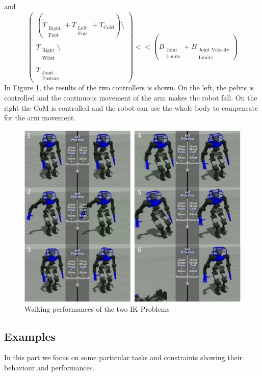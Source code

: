 and
\begin{equation}
\begin{pmatrix}
\left(T_{\substack{\text{Right}\\\text{Foot}}} + T_{\substack{\text{Left}\\\text{Foot}}} + T_\text{CoM}\right)\setminus\\
\\
T_{\substack{\text{Right}\\\text{Wrist}}}\setminus\\
\\
T_{\substack{\text{Joint}\\\text{Posture}}}
\end{pmatrix}
<< \left(B_{\substack{\text{Joint}\\\text{Limits}}} + B_{\substack{\text{Joint Velocity}\\\text{Limits}}}\right)
\end{equation}
In Figure \ref{walk_snapshot}, the results of the two controllers is shown. On the left, the pelvis is controlled and the continuous movement of the arm makes the robot fall. On the right the CoM is controlled and the robot can use the whole body to compensate for the arm movement. 
\begin{figure}[!h]
\vspace{2 mm}
\centering
\includegraphics[width=\textwidth]{images/walking/walking_snapshot.eps}
\caption{Walking performances of the two IK Problems}
\label{walk_snapshot}
\end{figure}


\subsection{Examples}
In this part we focus on some particular tasks and constraints showing their behaviour and performances.

